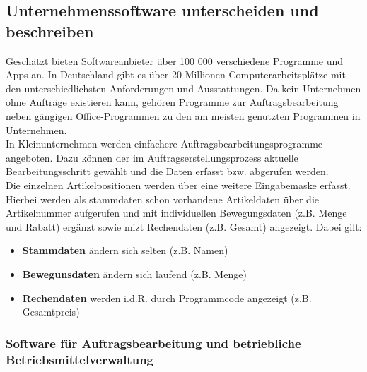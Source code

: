 \documentclass[a4paper, 12pt]{report}
\begin{document}
\subsection{Unternehmenssoftware unterscheiden und beschreiben}

Geschätzt bieten Softwareanbieter über 100 000 verschiedene Programme und Apps 
an. In Deutschland gibt es über 20 Millionen Computerarbeitsplätze mit den 
unterschiedlichsten Anforderungen und Ausstattungen. Da kein Unternehmen ohne 
Aufträge existieren kann, gehören Programme zur Auftragsbearbeitung neben 
gängigen Office-Programmen zu den am meisten genutzten Programmen in 
Unternehmen. \\

In Kleinunternehmen werden einfachere Auftragsbearbeitungsprogramme angeboten. 
Dazu können der im Auftragserstellungsprozess aktuelle Bearbeitungsschritt 
gewählt und die Daten erfasst bzw. abgerufen werden. \\

Die einzelnen Artikelpositionen werden über eine weitere Eingabemaske erfasst. 
Hierbei werden als  stammdaten schon vorhandene Artikeldaten über die 
Artikelnummer aufgerufen und mit individuellen Bewegungsdaten (z.B. Menge und 
Rabatt) ergänzt sowie mizt Rechendaten (z.B. Gesamt) angezeigt. Dabei  gilt: 

\begin{itemize}
    \item \textbf{Stammdaten} ändern sich selten (z.B. Namen)
    \item \textbf{Bewegunsdaten} ändern sich laufend (z.B. Menge)
    \item \textbf{Rechendaten} werden i.d.R. durch Programmcode angezeigt (z.B. 
        Gesamtpreis)
\end{itemize}

\subsubsection{Software für Auftragsbearbeitung und betriebliche 
Betriebsmittelverwaltung}
\end{document}
